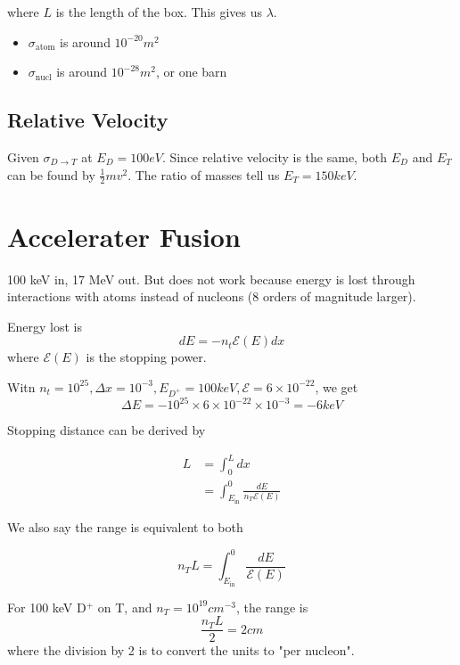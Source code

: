 \documentclass[12pt]{article}
\begin{document}
where $L$ is the length of the box. This gives us $\lambda$.

\begin{itemize}
    \item $\sigma_{\text{atom}}$ is around $10^{-20}\unit{m^2}$
    \item $\sigma_{\text{nucl}}$ is around $10^{-28}\unit{m^2}$, or one barn
\end{itemize}

\subsection{Relative Velocity}

\begin{ex}
    Given $\sigma_{D\rightarrow T}$ at $E_D = 100 \unit{eV}$. Since relative velocity is the same, both $E_D$ and $E_T$ can be found by $\frac{1}{2} mv^2$. The ratio of masses tell us $E_T = 150\unit{keV}$.
\end{ex}

\section{Accelerater Fusion}

100 keV in, 17 MeV out. But does not work because energy is lost through interactions with atoms instead of nucleons (8 orders of magnitude larger).

\begin{rem}
    Energy lost is
    $$dE = -n_t\mathcal E(E)dx$$
    where $\mathcal E(E)$ is the stopping power.
\end{rem}

\begin{ex}
    Witn $n_t = 10^{25}, \Delta x = 10^{-3}, E_{D^+} = 100 \unit{keV}, \mathcal E = 6 \times 10^{-22}$, we get
    $$\Delta E = -10^{25} \times 6 \times 10^{-22} \times 10^{-3} = -6\unit{keV}$$
\end{ex}

Stopping distance can be derived by

\begin{align*}
    L &= \int_0^L dx \\
      &= \int_{E_\text{in}}^0 \frac{dE}{n_T\mathcal E(E)}
\end{align*}

We also say the range is equivalent to both

$$n_TL = \int_{E_\text{in}}^0 \frac{dE}{\mathcal E(E)}$$

\begin{ex}
    For 100 keV D$^+$ on T, and $n_T = 10^{19} \unit{cm^{-3}}$, the range is
    $$\frac{n_TL}{2} = 2\unit{cm}$$
    where the division by 2 is to convert the units to "per nucleon".
\end{ex}
\end{document}
